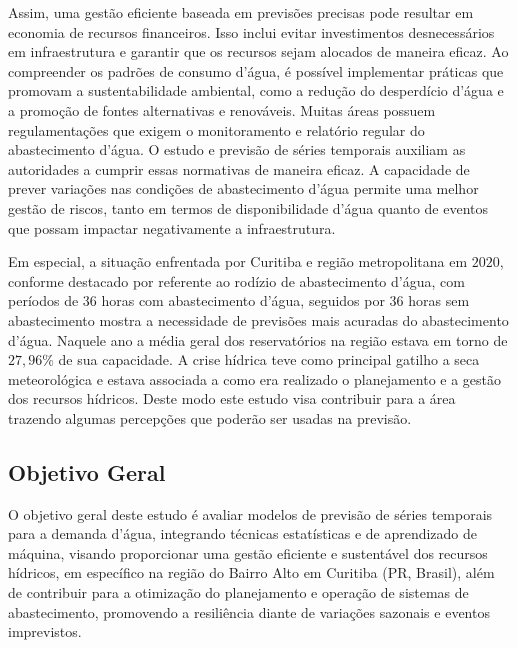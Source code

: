 Assim, uma gestão eficiente baseada em previsões precisas pode resultar em economia de recursos financeiros. Isso inclui evitar investimentos desnecessários em infraestrutura e garantir que os recursos sejam alocados de maneira eficaz. Ao compreender os padrões de consumo d'água, é possível implementar práticas que promovam a sustentabilidade ambiental, como a redução do desperdício d'água e a promoção de fontes alternativas e renováveis. Muitas áreas possuem regulamentações que exigem o monitoramento e relatório regular do abastecimento d'água. O estudo e previsão de séries temporais auxiliam as autoridades a cumprir essas normativas de maneira eficaz. A capacidade de prever variações nas condições de abastecimento d'água permite uma melhor gestão de riscos, tanto em termos de disponibilidade d'água quanto de eventos que possam impactar negativamente a infraestrutura.

Em especial, a situação enfrentada por Curitiba e região metropolitana em $2020$, conforme destacado por \cite{vasconcelos_2020} referente ao rodízio de abastecimento d'água, com períodos de 36 horas com abastecimento d'água, seguidos por 36 horas sem abastecimento mostra a necessidade de previsões mais acuradas do abastecimento d'água. Naquele ano a média geral dos reservatórios na região estava em torno de $27,96\%$ de sua capacidade. A crise hídrica teve como principal gatilho a seca meteorológica e estava associada a como era realizado o planejamento e a gestão dos recursos hídricos. Deste modo este estudo visa contribuir para a área trazendo algumas percepções que poderão ser usadas na previsão.

\subsection{Objetivo Geral} \label{subsec:objetivos}

O objetivo geral deste estudo é avaliar modelos de previsão de séries temporais para a demanda d'água, integrando técnicas estatísticas e de aprendizado de máquina, visando proporcionar uma gestão eficiente e sustentável dos recursos hídricos, em específico na região do Bairro Alto em Curitiba (PR, Brasil), além de contribuir para a otimização do planejamento e operação de sistemas de abastecimento, promovendo a resiliência diante de variações sazonais e eventos imprevistos.

